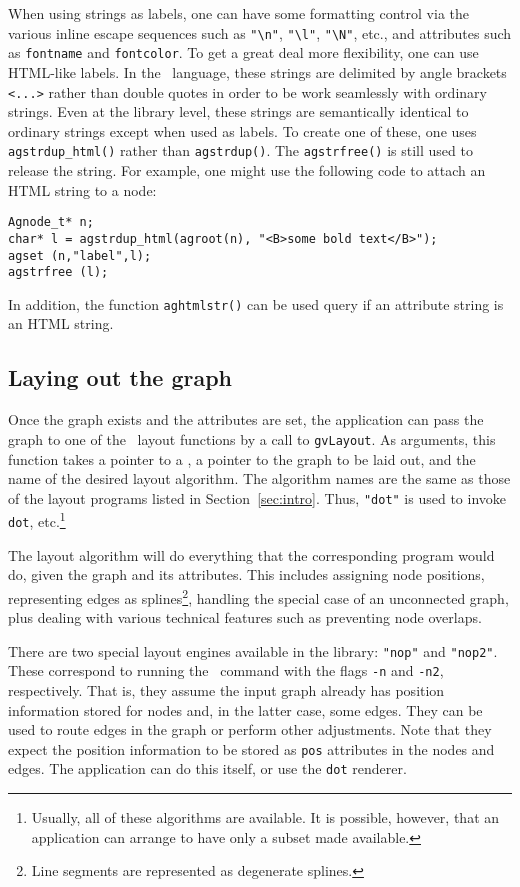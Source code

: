 When using strings as labels, one can have some formatting control via
the various inline escape sequences such as \verb+"\n"+, \verb+"\l"+, 
\verb+"\N"+, etc., and attributes such as {\tt fontname} and {\tt fontcolor}.
To get a great deal more flexibility, one can use HTML-like labels. 
In the \DOT\ language, these strings are delimited by angle brackets
{\tt <...>} rather than double quotes in order to be work seamlessly with
ordinary strings. Even at the library level, these strings are semantically
identical to ordinary strings except when used as labels. 
To create one of these, one uses {\tt agstrdup\_html()}
rather than {\tt agstrdup()}. The {\tt agstrfree()} is still used to
release the string. For example, one might use the following code to attach
an HTML string to a node:
\begin{verbatim}
Agnode_t* n;
char* l = agstrdup_html(agroot(n), "<B>some bold text</B>");
agset (n,"label",l);
agstrfree (l);
\end{verbatim}
In addition, the function  {\tt aghtmlstr()} 
can be used query if an attribute string is an HTML string.

\subsection{Laying out the graph}

Once the graph exists and the attributes are set, the application can
pass the graph to one of the \gviz\ layout functions by a call to
{\tt gvLayout}. As arguments, this function takes a pointer to a \gvc, a
pointer to the graph to be laid out, and the name of the desired layout
algorithm. The algorithm names are the same as those of the layout
programs listed in Section~\ref{sec:intro}. Thus, {\tt "dot"} is used
to invoke {\tt dot}, etc.\footnote{Usually, all of these algorithms
are available. It is possible, however, that an application can arrange
to have only a subset made available.}

The layout algorithm will do everything that the corresponding
program would do, given the graph and its attributes. This includes
assigning node positions,
representing edges as splines\footnote{
Line segments are represented as degenerate splines.
}, handling the special case of an unconnected
graph, plus dealing with various technical features such as preventing
node overlaps.

There are two special layout engines available in the library: 
{\tt "nop"} and {\tt "nop2"}. These correspond to running the
\neato\ command with the flags {\tt -n} and {\tt -n2}, respectively.
That is, they assume the input graph already has position information stored
for nodes and, in the latter case, some edges. They can be used to route
edges in the graph or perform other adjustments. Note that they expect
the position information to be stored as {\tt pos} attributes in the
nodes and edges. The application can do this itself, or use the
{\tt dot} renderer.

